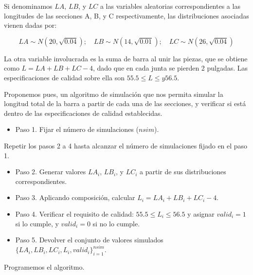 \documentclass[
]{book}
\providecommand{\tightlist}{%
  \setlength{\itemsep}{0pt}\setlength{\parskip}{0pt}}
\newenvironment{silverbox}{
  \definecolor{shadecolor}{rgb}{192, 192, 192}  
  \color{black}
  \begin{shaded}}
 {\end{shaded}}
\theoremstyle{definition}
\theoremstyle{definition}
\theoremstyle{definition}
\theoremstyle{definition}
\theoremstyle{remark}
\begin{document}
Si denominamos \(LA\), \(LB\), y \(LC\) a las variables aleatorias correspondientes a las longitudes de las secciones A, B, y C respectivamente, las distribuciones asociadas vienen dadas por:

\[LA \sim N(20, \sqrt{0.04}); \quad LB \sim N(14, \sqrt{0.01}); \quad  LC \sim N(26, \sqrt{0.04})\]

La otra variable involucrada es la suma de barra al unir las piezas, que se obtiene como \(L=LA+LB+LC-4\), dado que en cada junta se pierden 2 pulgadas. Las especificaciones de calidad sobre ella son \(55.5 \leq L \leq y 56.5\).

Proponemos pues, un algoritmo de simulación que nos permita simular la longitud total de la barra a partir de cada una de las secciones, y verificar si está dentro de las especificaciones de calidad establecidas.

\begin{silverbox}

\begin{itemize}
\tightlist
\item
  Paso 1. Fijar el número de simulaciones (\(nsim\)).
\end{itemize}

Repetir los pasos 2 a 4 hasta alcanzar el número de simulaciones fijado en el paso 1.

\begin{itemize}
\item
  Paso 2. Generar valores \(LA_i\), \(LB_i\), y \(LC_i\) a partir de sus distribuciones correspondientes.\\
\item
  Paso 3. Aplicando composición, calcular \(L_i = LA_i + LB_i + LC_i - 4.\)
\item
  Paso 4. Verificar el requisito de calidad: \(55.5 \leq L_i \leq 56.5\) y asignar \(valid_i = 1\) si lo cumple, y \(valid_i = 0\) si no lo cumple.
\item
  Paso 5. Devolver el conjunto de valores simulados \(\{LA_i, LB_i, LC_i, L_i, valid_i\}_{i=1}^{nsim}.\)
\end{itemize}

\end{silverbox}

Programemos el algoritmo.
\end{document}
